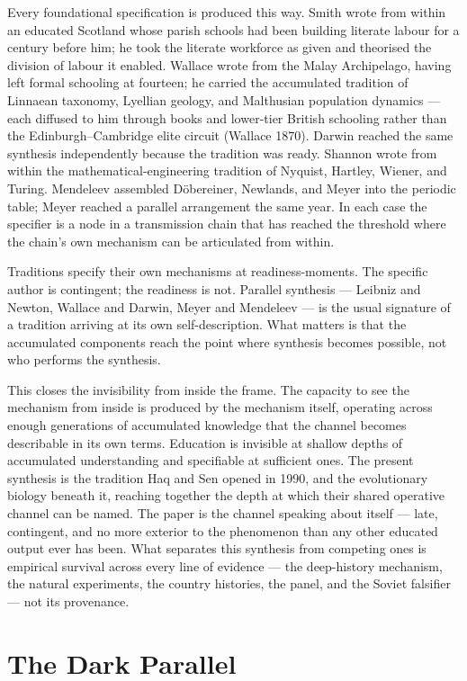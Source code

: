 \documentclass[12pt,letterpaper]{article}
\begin{document}
Every foundational specification is produced this way. Smith wrote from
within an educated Scotland whose parish schools had been building
literate labour for a century before him; he took the literate workforce
as given and theorised the division of labour it enabled. Wallace
wrote from the Malay Archipelago, having left formal schooling at
fourteen; he carried the accumulated tradition of Linnaean taxonomy,
Lyellian geology, and Malthusian population dynamics --- each diffused
to him through books and lower-tier British schooling rather than the
Edinburgh--Cambridge elite circuit (Wallace 1870). Darwin reached the
same synthesis independently because the tradition was ready. Shannon
wrote
from within the mathematical-engineering tradition of Nyquist, Hartley,
Wiener, and Turing. Mendeleev assembled Döbereiner, Newlands, and Meyer
into the periodic table; Meyer reached a parallel arrangement the same
year. In each case the specifier is a node in a transmission chain that
has reached the threshold where the chain's own mechanism can be
articulated from within.

Traditions specify their own mechanisms at readiness-moments. The
specific author is contingent; the readiness is not. Parallel synthesis
--- Leibniz and Newton, Wallace and Darwin, Meyer and Mendeleev --- is
the usual signature of a tradition arriving at its own self-description.
What matters is that the accumulated components reach the point where
synthesis becomes possible, not who performs the synthesis.

This closes the invisibility from inside the frame. The
capacity to see the mechanism from inside is produced by the mechanism
itself, operating across enough generations of accumulated knowledge
that the channel becomes describable in its own terms. Education is
invisible at shallow depths of accumulated understanding and specifiable
at sufficient ones. The present synthesis is the tradition Haq and Sen
opened in 1990, and the evolutionary biology beneath it, reaching
together the depth at which their shared operative channel can be named. The paper is the channel speaking about itself --- late,
contingent, and no more exterior to the phenomenon than any other
educated output ever has been. What separates this synthesis from competing ones is empirical survival across every line of evidence --- the deep-history mechanism, the natural experiments, the country histories, the panel, and the Soviet falsifier --- not its provenance.

\section{The Dark Parallel}\label{the-dark-parallel}
\end{document}
